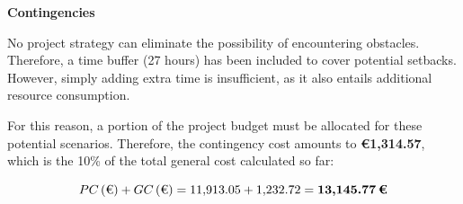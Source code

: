 
\textbf{Contingencies}
\vspace{-5pt}

No project strategy can eliminate the possibility of encountering obstacles. Therefore, a time buffer (27 hours) has been included to cover potential setbacks. However, simply adding extra time is insufficient, as it also entails additional resource consumption. 

For this reason, a portion of the project budget must be allocated for these potential scenarios. Therefore, the contingency cost amounts to \textbf{€1,314.57}, which is the 10\% of the total general cost calculated so far: 

\vspace{-20pt}
 
\[
PC\,(\text{€}) + GC\,(\text{€}) = 11{,}913.05 + 1{,}232.72 = \textbf{13{,}145.77\,\text{€}}
\]
\vspace{-10pt}

